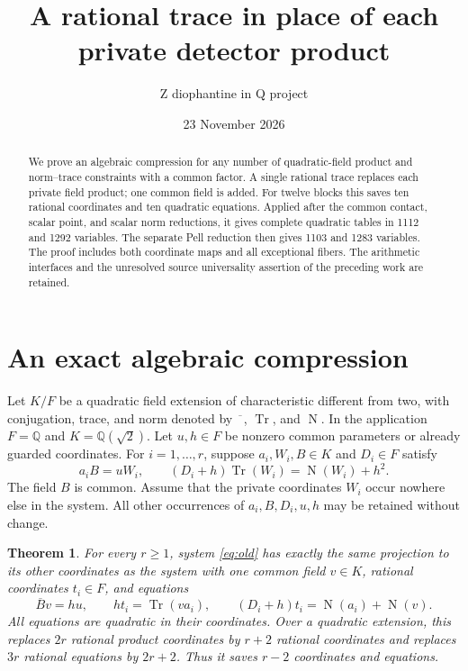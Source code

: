 \documentclass[11pt]{article}
\title{A rational trace in place of each private detector product}
\author{Z diophantine in Q project}
\date{23 November 2026}
\newtheorem{theorem}{Theorem}
\newcommand{\Q}{\mathbb Q}
\newcommand{\Tr}{\operatorname{Tr}}
\newcommand{\Nm}{\operatorname{N}}
\begin{document}
\maketitle
\begin{abstract}
We prove an algebraic compression for any number of quadratic-field
product and norm--trace constraints with a common factor. A single
rational trace replaces each private field product; one common field
is added. For twelve blocks this saves ten rational coordinates and
ten quadratic equations. Applied after the common contact, scalar
point, and scalar norm reductions, it gives complete quadratic tables
in 1112 and 1292 variables. The separate Pell reduction then gives
1103 and 1283 variables. The proof includes both coordinate maps and
all exceptional fibers. The arithmetic interfaces and the unresolved
source universality assertion of the preceding work are retained.
\end{abstract}

\section{An exact algebraic compression}

Let \(K/F\) be a quadratic field extension of characteristic different
from two, with conjugation, trace, and norm denoted by
\(\overline{\phantom{x}}\), \(\Tr\), and \(\Nm\). In the application
\(F=\Q\) and \(K=\Q(\sqrt2)\). Let \(u,h\in F\) be nonzero
common parameters or already guarded coordinates. For
\(i=1,\ldots,r\), suppose \(a_i,W_i,B\in K\) and \(D_i\in F\)
satisfy
\begin{equation}\label{eq:old}
       a_i B=uW_i,\qquad
       (D_i+h)\Tr(W_i)=\Nm(W_i)+h^2.
\end{equation}
The field \(B\) is common. Assume that the private coordinates
\(W_i\) occur nowhere else in the system. All other occurrences
of \(a_i,B,D_i,u,h\) may be retained without change.

\begin{theorem}\label{thm:compression}
For every \(r\ge1\), system \eqref{eq:old} has exactly the same
projection to its other coordinates as the system with one common
field \(v\in K\), rational coordinates \(t_i\in F\), and equations
\begin{equation}\label{eq:new}
 \overline B v=hu,\qquad
 h t_i=\Tr(v a_i),\qquad
 (D_i+h)t_i=\Nm(a_i)+\Nm(v).
\end{equation}
All equations are quadratic in their coordinates. Over a quadratic
extension, this replaces \(2r\) rational product coordinates by
\(r+2\) rational coordinates and replaces \(3r\) rational equations
by \(2r+2\). Thus it saves \(r-2\) coordinates and equations.
\end{theorem}
\end{document}
